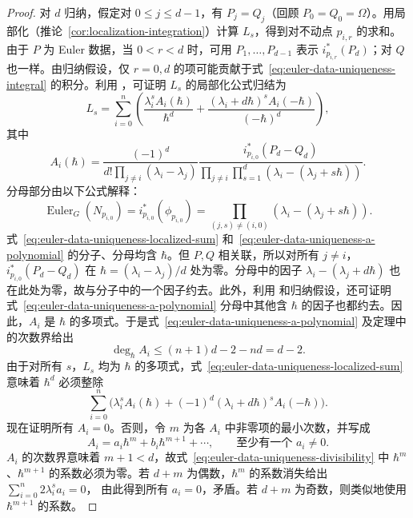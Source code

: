 \begin{proof}
对 $d$ 归纳，假定对 $0\le j\le d-1$，有 $P_j=Q_j$（回顾 $P_0=Q_0=\Omega$）。用局部化（推论~\ref{cor:localization-integration}）计算 $L_s$，得到对不动点 $p_{i,r}$ 的求和。由于 $P$ 为 Euler 数据，当 $0<r<d$ 时，可用 $P_1,\ldots,P_{d-1}$ 表示 $i_{p_{i,r}}^*(P_d)$；对 $Q$ 也一样。由归纳假设，仅 $r=0,d$ 的项可能贡献于式~\eqref{eq:euler-data-uniqueness-integral} 的积分。利用 ，可证明 $L_s$ 的局部化公式归结为
\begin{equation}\label{eq:euler-data-uniqueness-localized-sum}
L_s=\sum_{i=0}^n\left(\frac{\lambda_i^sA_i(\hbar)}{\hbar^d}
+\frac{(\lambda_i+d\hbar)^sA_i(-\hbar)}{(-\hbar)^d}\right),
\end{equation}
其中
\begin{equation}\label{eq:euler-data-uniqueness-a-polynomial}
A_i(\hbar)=\frac{(-1)^d}{d!\prod_{j\ne i}(\lambda_i-\lambda_j)}
\frac{i_{p_{i,0}}^*(P_d-Q_d)}
{\prod_{j\ne i}\prod_{s=1}^d(\lambda_i-(\lambda_j+s\hbar))}.
\end{equation}
分母部分由以下公式解释：
\[
\operatorname{Euler}_G(N_{p_{i,0}})=i_{p_{i,0}}^*(\phi_{p_{i,0}})
=\prod_{(j,s)\ne(i,0)}(\lambda_i-(\lambda_j+s\hbar)).
\]
式~\eqref{eq:euler-data-uniqueness-localized-sum} 和~\eqref{eq:euler-data-uniqueness-a-polynomial} 的分子、分母均含 $\hbar$。但 $P,Q$ 相关联，所以对所有 $j\ne i$，$i_{p_{i,0}}^*(P_d-Q_d)$ 在 $\hbar=(\lambda_i-\lambda_j)/d$ 处为零。分母中的因子 $\lambda_i-(\lambda_j+d\hbar)$ 也在此处为零，故与分子中的一个因子约去。此外，利用  和归纳假设，还可证明式~\eqref{eq:euler-data-uniqueness-a-polynomial} 分母中其他含 $\hbar$ 的因子也都约去。因此，$A_i$ 是 $\hbar$ 的多项式。于是式~\eqref{eq:euler-data-uniqueness-a-polynomial} 及定理中的次数界给出
\[
\deg_\hbar A_i\le(n+1)d-2-nd=d-2.
\]
由于对所有 $s$，$L_s$ 均为 $\hbar$ 的多项式，式~\eqref{eq:euler-data-uniqueness-localized-sum} 意味着 $\hbar^d$ 必须整除
\begin{equation}\label{eq:euler-data-uniqueness-divisibility}
\sum_{i=0}^n\bigl(\lambda_i^sA_i(\hbar)
+(-1)^d(\lambda_i+d\hbar)^sA_i(-\hbar)\bigr).
\end{equation}
现在证明所有 $A_i=0$。否则，令 $m$ 为各 $A_i$ 中非零项的最小次数，并写成
\[
A_i=a_i\hbar^m+b_i\hbar^{m+1}+\cdots,
\qquad\text{至少有一个 }a_i\ne0.
\]
$A_i$ 的次数界意味着 $m+1<d$，故式~\eqref{eq:euler-data-uniqueness-divisibility} 中 $\hbar^m$、$\hbar^{m+1}$ 的系数必须为零。若 $d+m$ 为偶数，$\hbar^m$ 的系数消失给出 $\sum_{i=0}^n2\lambda_i^sa_i=0$，
由此得到所有 $a_i=0$，矛盾。若 $d+m$ 为奇数，则类似地使用 $\hbar^{m+1}$ 的系数。
\end{proof}

